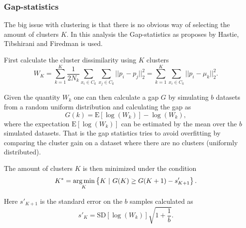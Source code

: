 \subsubsection{Gap-statistics}

The big issue with clustering is that there is no obvious way of selecting the amount of clusters $K$. In this analysis the Gap-statistics \cite[p.~519]{statistical-learning} as proposes by Hastie, Tibshirani and Firedman is used.

First calculate the cluster dissimilarity using $K$ clusters \cite{gap-statistic}
\begin{equation}
W_K = \sum_{k=1}^K \frac{1}{2 N_k} \sum_{x_i\in C_k} \sum_{x_j\in C_k} ||p_i - p_j||_2^2 = \sum_{k=1}^K \sum_{x_i\in C_k} ||p_i - \mu_k||_2^2.
\end{equation}

Given the quantity $W_k$ one can then calculate a gap $G$ by simulating $b$ datasets from a random uniform distribution and calculating the gap as
\begin{equation}
G(k) = \mathrm{E}[\log(W_k)] - \log(W_k),
\end{equation}
where the expectation $\mathrm{E}[\log(W_k)]$ can be estimated by the mean over the $b$ simulated datasets. That is the gap statistics tries to avoid overfitting by comparing the cluster gain on a dataset where there are no clusters (uniformly distributed).

The amount of clusters $K$ is then minimized under the condition
\begin{equation}
K^{*} = \operatorname*{arg\,min}_K \left\{ K \ | \ G(K) \ge G(K + 1) - s'_{K+1} \right\}.
\end{equation}

Here $s'_{K+1}$ is the standard error on the $b$ samples calculated as 
\begin{equation}
s'_{K} = \mathrm{SD}[\log(W_k)] \sqrt{1+\frac{1}{b}}.
\end{equation}
